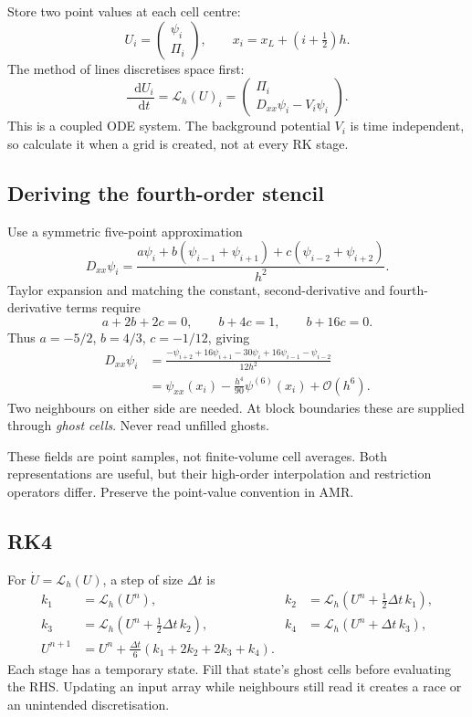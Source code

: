 \documentclass[11pt,a4paper]{article}
\numberwithin{equation}{section}
\newcommand{\dd}{\mathop{}\!\mathrm{d}}
\newcommand{\OO}{\mathcal{O}}
\begin{document}
Store two point values at each cell centre:
\begin{equation}
 U_i=\begin{pmatrix}\psi_i\\\Pi_i\end{pmatrix},\qquad
 x_i=x_L+(i+\tfrac12)h .
\end{equation}
The method of lines discretises space first:
\begin{equation}\label{eq:mol}
 \frac{\dd U_i}{\dd t}=\mathcal L_h(U)_i
 =\begin{pmatrix}\Pi_i\\D_{xx}\psi_i-V_i\psi_i\end{pmatrix}.
\end{equation}
This is a coupled ODE system. The background potential $V_i$ is time
independent, so calculate it when a grid is created, not at every RK stage.

\subsection{Deriving the fourth-order stencil}
Use a symmetric five-point approximation
\begin{equation}
 D_{xx}\psi_i=\frac{a\psi_i+b(\psi_{i-1}+\psi_{i+1})
                   +c(\psi_{i-2}+\psi_{i+2})}{h^2}.
\end{equation}
Taylor expansion and matching the constant, second-derivative and
fourth-derivative terms require
\begin{equation}
 a+2b+2c=0,\qquad b+4c=1,\qquad b+16c=0 .
\end{equation}
Thus $a=-5/2$, $b=4/3$, $c=-1/12$, giving
\begin{align}\label{eq:stencil}
 D_{xx}\psi_i
 &=\frac{-\psi_{i+2}+16\psi_{i+1}-30\psi_i+
                    16\psi_{i-1}-\psi_{i-2}}{12h^2}\\
 &=\psi_{xx}(x_i)-\frac{h^4}{90}\psi^{(6)}(x_i)+\OO(h^6).
\end{align}
Two neighbours on either side are needed. At block boundaries these are
supplied through \emph{ghost cells}. Never read unfilled ghosts.

These fields are point samples, not finite-volume cell averages. Both
representations are useful, but their high-order interpolation and
restriction operators differ. Preserve the point-value convention in AMR.

\subsection{RK4}
For $\dot U=\mathcal L_h(U)$, a step of size $\Delta t$ is
\begin{align}
 k_1&=\mathcal L_h(U^n),&
 k_2&=\mathcal L_h(U^n+\tfrac12\Delta t\,k_1),\\
 k_3&=\mathcal L_h(U^n+\tfrac12\Delta t\,k_2),&
 k_4&=\mathcal L_h(U^n+\Delta t\,k_3),\\
 U^{n+1}&=U^n+\frac{\Delta t}{6}(k_1+2k_2+2k_3+k_4).
\end{align}
Each stage has a temporary state. Fill that state's ghost cells before
evaluating the RHS. Updating an input array while neighbours still read it
creates a race or an unintended discretisation.
\end{document}
